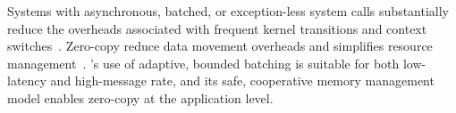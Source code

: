 Systems with asynchronous, batched, or exception-less system calls
substantially reduce the overheads associated with frequent kernel
transitions and context switches~\cite{
  soares2010flexsc,han2012megapipe,rizzo2012netmap,jeong2014mtcp}.
Zero-copy reduce data movement overheads and simplifies resource
management~\cite{DBLP:journals/tocs/PaiDZ00}.  \ix's use of adaptive,
bounded batching is suitable for both low-latency and high-message
rate, and its safe, cooperative memory management model enables
zero-copy at the application level.


